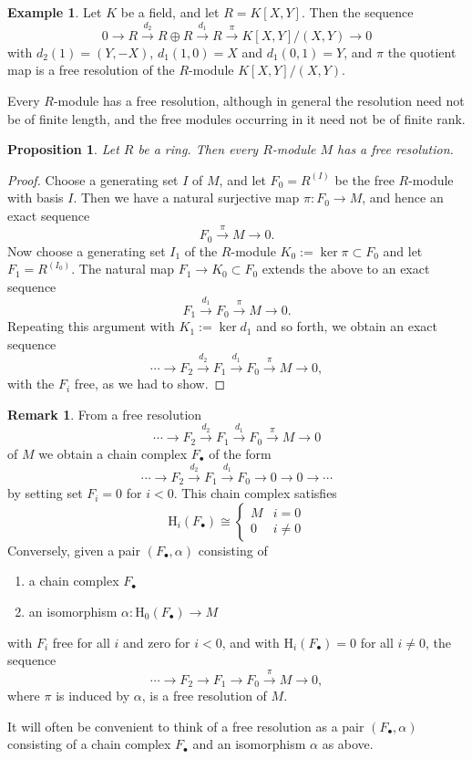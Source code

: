 \documentclass[11pt]{amsbook}
\newcommand{\longto}{\longrightarrow}
\def\rH{{\mathrm H}} \def\rK{{\mathrm K}} \def\rR{{\mathrm R}}
\theoremstyle{plain}
\newtheorem{proposition}[theorem]{Proposition}
\theoremstyle{definition}
\newtheorem{example}[theorem]{Example}
\newtheorem{remark}[theorem]{Remark}
\begin{document}
\begin{example}
Let $K$ be a field, and let $R=K[X,Y]$. Then the sequence
\[
	0 \longto R  \overset{d_2}{\longto} R \oplus R
	\overset{d_1}{\longto} R \overset{\pi}{\longto} K[X,Y]/(X,Y) \longto 0 
\]
with $d_2(1) = (Y,-X)$, $d_1(1,0) = X$ and $d_1(0,1)=Y$, and $\pi$ the quotient map is a free resolution of the $R$-module $K[X,Y]/(X,Y)$.
\end{example}

Every $R$-module has a free resolution, although in general the resolution need not be of finite length, and the free modules occurring in it need  not be of finite rank.

\begin{proposition}\label{prop:free-resolutions-exist}
Let $R$ be a ring. Then every $R$-module $M$ has  a  free resolution.
\end{proposition}

\begin{proof}
Choose a generating set $I$ of $M$, and let $F_0= R^{(I)}$ be the free $R$-module with basis $I$. Then we have a natural surjective map $\pi\colon F_0\to M$, and hence an exact sequence
\[
	F_0 \overset{\pi}{\longto} M \longto 0.
\]
Now choose a generating set $I_1$ of the $R$-module 
 $K_0 := \ker \pi \subset F_0$ and let $F_1=R^{(I_0)}$. The natural map $F_1 \to K_0 \subset F_0$
 extends the above to an exact sequence
 \[
 	F_1 \overset{d_1}{\longto} F_0 \overset{\pi}{\longto} M \longto 0.
\]
Repeating this argument with $K_1 := \ker d_1$ and so forth, we obtain an exact sequence
\[
	\cdots \longto F_2 \overset{d_2}{\longto} F_1 \overset{d_1}{\longto} F_0 \overset{\pi}{\longto} M \longto 0,
\]
with the $F_i$ free, as we had to show.
\end{proof}

\begin{remark}From a free resolution
\[
	\cdots \longto F_2 \overset{d_2}{\longto} F_1 \overset{d_1}{\longto} F_0 \overset{\pi}{\longto} M \longto 0 
\]
of $M$ we obtain a chain complex $F_\bullet$ of the form
\[
	\cdots \longto F_2 \overset{d_2}{\longto} F_1 \overset{d_1}{\longto} F_0 \longto 0 \longto  0 \longto \cdots
\]
by setting set $F_{i}=0$ for $i<0$.  This chain complex satisfies
\[
	 \rH_i(F_\bullet) \cong \begin{cases} M & i=0 \\ 0 & i \neq 0 \end{cases}
\]
Conversely, given a pair $(F_\bullet,\alpha)$ consisting of
\begin{enumerate}
\item a chain complex $F_\bullet$ 
\item an isomorphism $\alpha\colon \rH_0(F_\bullet) \to M$
\end{enumerate}
with $F_i$ free for all $i$ and zero for $i<0$, and with $\rH_i(F_\bullet)=0$ for all $i\neq 0$, the sequence
\[
	\cdots \longto F_2 \longto F_1 \longto F_0 \overset{\pi} \longto M \longto 0,
\]
where $\pi$ is induced by $\alpha$, is a free resolution of $M$. 

It will often be convenient to think of a free resolution as a pair $(F_\bullet,\alpha)$ consisting of a chain complex $F_\bullet$ and an isomorphism $\alpha$ as above.
\end{remark}
\end{document}
